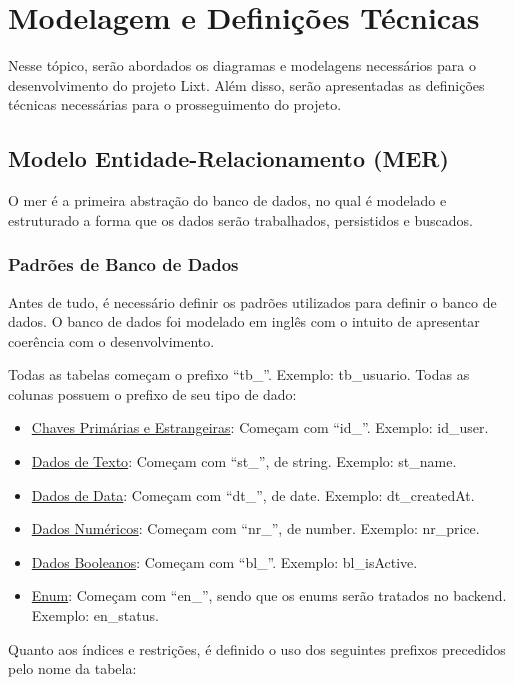 \section{Modelagem e Definições Técnicas}

Nesse tópico, serão abordados os diagramas e modelagens necessários para o desenvolvimento do projeto Lixt. Além disso, serão apresentadas as definições técnicas necessárias para o prosseguimento do projeto.

\subsection{Modelo Entidade-Relacionamento (MER)}

O \gls{mer} é a primeira abstração do banco de dados, no qual é modelado e estruturado a forma que os dados serão trabalhados, persistidos e buscados.

\subsubsection{Padrões de Banco de Dados}

Antes de tudo, é necessário definir os padrões utilizados para definir o banco de dados. O banco de dados foi modelado em inglês com o intuito de apresentar coerência com o desenvolvimento.

Todas as tabelas começam o prefixo ``tb\_''. Exemplo: tb\_usuario. Todas as colunas possuem o prefixo de seu tipo de dado:

\begin{itemize}
	\item \underline{Chaves Primárias e Estrangeiras}: Começam com ``id\_''. Exemplo: id\_user.
	\item \underline{Dados de Texto}: Começam com ``st\_'', de string. Exemplo: st\_name.
	\item \underline{Dados de Data}: Começam com ``dt\_'', de date. Exemplo: dt\_createdAt.
	\item \underline{Dados Numéricos}: Começam com ``nr\_'', de number. Exemplo: nr\_price.  
		\item \underline{Dados Booleanos}: Começam com ``bl\_''. Exemplo: bl\_isActive.  
	\item \underline{Enum}: Começam com ``en\_'', sendo que os enums serão tratados no backend. Exemplo: en\_status.  
\end{itemize}

Quanto aos índices e restrições, é definido o uso dos seguintes prefixos precedidos pelo nome da tabela:

